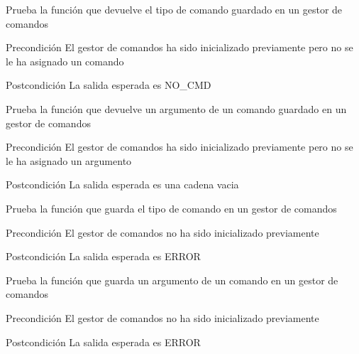 \begin{DoxyRefList}
\item[\label{test__test000015}%
\hypertarget{test__test000015}{}%
Global \hyperlink{command__test_8c_a41e0413cb7402808064a47e714418b0e}{test3\-\_\-command\-\_\-get\-\_\-cmd} ()]Prueba la función que devuelve el tipo de comando guardado en un gestor de comandos \begin{DoxyPrecond}{Precondición}
El gestor de comandos ha sido inicializado previamente pero no se le ha asignado un comando 
\end{DoxyPrecond}
\begin{DoxyPostcond}{Postcondición}
La salida esperada es N\-O\-\_\-\-C\-M\-D  
\end{DoxyPostcond}

\item[\label{test__test000018}%
\hypertarget{test__test000018}{}%
Global \hyperlink{command__test_8c_abceb78c2c5722e2613166861b2723ba7}{test3\-\_\-command\-\_\-get\-\_\-cmd\-\_\-arg} ()]Prueba la función que devuelve un argumento de un comando guardado en un gestor de comandos \begin{DoxyPrecond}{Precondición}
El gestor de comandos ha sido inicializado previamente pero no se le ha asignado un argumento 
\end{DoxyPrecond}
\begin{DoxyPostcond}{Postcondición}
La salida esperada es una cadena vacia  
\end{DoxyPostcond}

\item[\label{test__test000008}%
\hypertarget{test__test000008}{}%
Global \hyperlink{command__test_8c_a95514b5ec42e57daa0d4899271979e7e}{test3\-\_\-command\-\_\-set\-\_\-cmd} ()]Prueba la función que guarda el tipo de comando en un gestor de comandos \begin{DoxyPrecond}{Precondición}
El gestor de comandos no ha sido inicializado previamente 
\end{DoxyPrecond}
\begin{DoxyPostcond}{Postcondición}
La salida esperada es E\-R\-R\-O\-R  
\end{DoxyPostcond}

\item[\label{test__test000011}%
\hypertarget{test__test000011}{}%
Global \hyperlink{command__test_8c_a68ac0c681f8b9ad99fd45c3d3a727058}{test3\-\_\-command\-\_\-set\-\_\-cmd\-\_\-arg} ()]Prueba la función que guarda un argumento de un comando en un gestor de comandos \begin{DoxyPrecond}{Precondición}
El gestor de comandos no ha sido inicializado previamente 
\end{DoxyPrecond}
\begin{DoxyPostcond}{Postcondición}
La salida esperada es E\-R\-R\-O\-R  
\end{DoxyPostcond}


\end{DoxyRefList}
